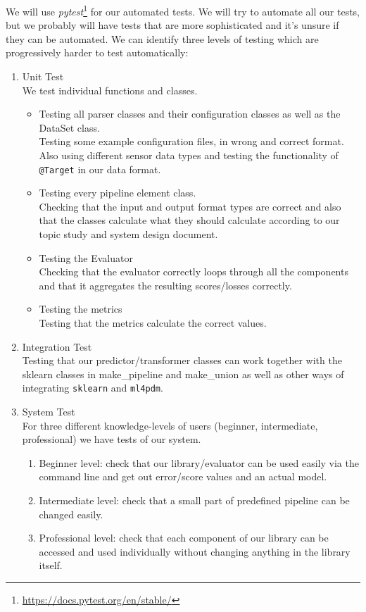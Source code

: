 We will use \textit{pytest}\footnote{\href{https://docs.pytest.org/en/stable/}{https://docs.pytest.org/en/stable/}} for our automated tests. We will try to automate all our tests, but we probably will have tests that are more sophisticated and it's unsure if they can be automated. We can identify three levels of testing which are progressively harder to test automatically:
\begin{enumerate}
	\item Unit Test\\
	      We test individual functions and classes.
	      \begin{itemize}
		      \item Testing all parser classes and their configuration classes as well as the DataSet class.\\
		            Testing some example configuration files, in wrong and correct format. Also using different sensor data types and testing the functionality of \verb|@Target| in our data format.
		      \item Testing every pipeline element class.\\
		            Checking that the input and output format types are correct and also that the classes calculate what they should calculate according to our topic study and system design document.
		      \item Testing the Evaluator\\
		            Checking that the evaluator correctly loops through all the components and that it aggregates the resulting scores/losses correctly.
		      \item Testing the metrics\\
		            Testing that the metrics calculate the correct values.
	      \end{itemize}
	\item Integration Test\\
	      Testing that our predictor/transformer classes can work together with the sklearn classes in make\_pipeline and make\_union as well as other ways of integrating \verb|sklearn| and \verb|ml4pdm|.
	\item System Test\\
	      For three different knowledge-levels of users (beginner, intermediate, professional) we have tests of our system.
	      \begin{enumerate}
		      \item[1)] Beginner level: check that our library/evaluator can be used easily via the command line and get out error/score values and an actual model.
		      \item[2)] Intermediate level: check that a small part of predefined pipeline can be changed easily.
		      \item[3)] Professional level: check that each component of our library can be accessed and used individually without changing anything in the library itself.
	      \end{enumerate}
\end{enumerate}


